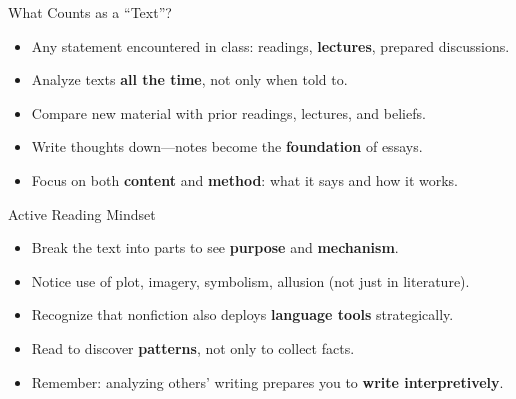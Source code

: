 \documentclass[aspectratio=169]{beamer}
\begin{document}
\begin{frame}{What Counts as a “Text”?}
\begin{itemize}
  \item Any statement encountered in class: readings, \textbf{lectures}, prepared discussions.
  \item Analyze texts \textbf{all the time}, not only when told to.
  \item Compare new material with prior readings, lectures, and beliefs.
  \item Write thoughts down—notes become the \textbf{foundation} of essays.
  \item Focus on both \textbf{content} and \textbf{method}: what it says and how it works.
\end{itemize}
\end{frame}

\begin{frame}{Active Reading Mindset}
\begin{itemize}
  \item Break the text into parts to see \textbf{purpose} and \textbf{mechanism}.
  \item Notice use of plot, imagery, symbolism, allusion (not just in literature).
  \item Recognize that nonfiction also deploys \textbf{language tools} strategically.
  \item Read to discover \textbf{patterns}, not only to collect facts.
  \item Remember: analyzing others’ writing prepares you to \textbf{write interpretively}.
\end{itemize}
\end{frame}

\end{document}
